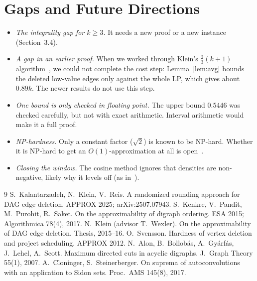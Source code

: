 \documentclass[sigconf,nonacm]{acmart}
\begin{document}
\section{Gaps and Future Directions}
\begin{itemize}
\item \emph{The integrality gap for $k\ge3$.} It needs a new proof or a new instance (Section~3.4).
\item \emph{A gap in an earlier proof.} When we worked through Klein's $\frac23(k+1)$ algorithm~\cite{kw}, we could not complete the cost step: Lemma~\ref{lem:avg} bounds the deleted low-value edges only against the whole LP, which gives about $0.89k$. The newer results do not use this step.
\item \emph{One bound is only checked in floating point.} The upper bound $0.5446$ was checked carefully, but not with exact arithmetic. Interval arithmetic would make it a full proof.
\item \emph{NP-hardness.} Only a constant factor ($\sqrt2$) is known to be NP-hard. Whether it is NP-hard to get an $O(1)$-approximation at all is open~\cite{kkr}.
\item \emph{Closing the window.} The cosine method ignores that densities are non-negative, likely why it levels off (as in~\cite{cs}).
\end{itemize}

\begin{thebibliography}{9}\setlength{\itemsep}{0pt}
 S.~Kalantarzadeh, N.~Klein, V.~Reis. A randomized rounding approach for DAG edge deletion. APPROX 2025; arXiv:2507.07943.
 S.~Kenkre, V.~Pandit, M.~Purohit, R.~Saket. On the approximability of digraph ordering. ESA 2015; Algorithmica 78(4), 2017.
 N.~Klein (advisor T.~Wexler). On the approximability of DAG edge deletion. Thesis, 2015--16.
 O.~Svensson. Hardness of vertex deletion and project scheduling. APPROX 2012.
 N.~Alon, B.~Bollob\'as, A.~Gy\'arf\'as, J.~Lehel, A.~Scott. Maximum directed cuts in acyclic digraphs. J.\ Graph Theory 55(1), 2007.
 A.~Cloninger, S.~Steinerberger. On suprema of autoconvolutions with an application to Sidon sets. Proc.\ AMS 145(8), 2017.
\end{thebibliography}
\end{document}
